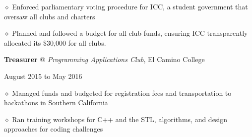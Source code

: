 \documentclass [11pt]{article}
\begin{document}
\begin{flushleft}
‭‭\quad\quad\quad$\diamond$ Enforced parliamentary voting procedure for ICC, a student government that oversaw all clubs and charters

‭‭\quad\quad\quad$\diamond$ Planned and followed a budget for all club funds, ensuring ICC transparently allocated its \$30,000 for all clubs.

\linebreak
\textbf{Treasurer} @ \emph{Programming Applications Club}, El Camino College \begin{minipage}{0.450 \linewidth}\begin{flushright}August 2015 to May 2016\end{flushright}\end{minipage}

‭‭\quad\quad\quad$\diamond$ Managed funds and budgeted for registration fees and transportation to hackathons in Southern California

‭‭\quad\quad\quad$\diamond$ Ran training workshops for C++ and the STL, algorithms, and design approaches for coding challenges




\end{flushleft}
\end{document}
